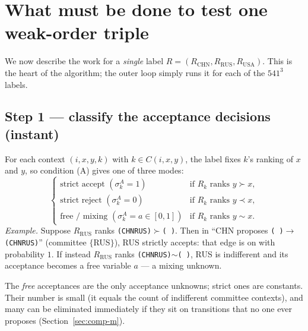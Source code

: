 \documentclass[11pt]{article}
\newcommand{\state}[1]{\texttt{(#1)}}
\newcommand{\empt}{\texttt{(\,)}}
\begin{document}
\section{What must be done to test one weak-order triple}
\label{sec:perlabel}

We now describe the work for a \emph{single} label $R=(R_{\text{CHN}},R_{\text{RUS}},
R_{\text{USA}})$. This is the heart of the algorithm; the outer loop simply runs it
for each of the $541^3$ labels.

\subsection{Step 1 --- classify the acceptance decisions (instant)}
\label{sec:classify}
For each context $(i,x,y,k)$ with $k\in C(i,x,y)$, the label fixes $k$'s ranking of
$x$ and $y$, so condition (A) gives one of three modes:
\[
\begin{cases}
\text{strict accept } (\sigma^A_k=1) & \text{if } R_k\text{ ranks } y \succ x,\\
\text{strict reject } (\sigma^A_k=0) & \text{if } R_k\text{ ranks } y \prec x,\\
\text{free / mixing } (\sigma^A_k=a\in[0,1]) & \text{if } R_k\text{ ranks } y \sim x.
\end{cases}
\]
\emph{Example.} Suppose $R_{\text{RUS}}$ ranks \state{CHNRUS}$\succ$\empt. Then in
``CHN proposes \empt$\to$\state{CHNRUS}'' (committee $\{$RUS$\}$), RUS strictly
accepts: that edge is on with probability $1$. If instead $R_{\text{RUS}}$ ranks
\state{CHNRUS}$\sim$\empt, RUS is indifferent and its acceptance becomes a free
variable $a$ --- a mixing unknown.

The \emph{free} acceptances are the only acceptance unknowns; strict ones are
constants. Their number is small (it equals the count of indifferent committee
contexts), and many can be eliminated immediately if they sit on transitions that no
one ever proposes (Section~\ref{sec:comp-m}).
\end{document}
